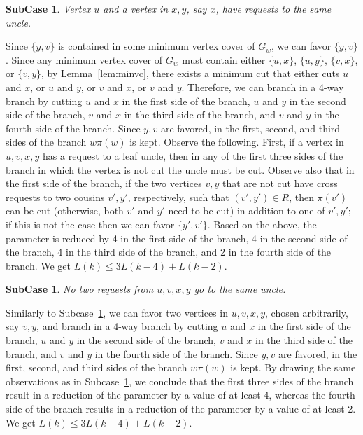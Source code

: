 \documentclass[11pt]{article}
\newtheorem{subcase}[theorem]{SubCase}
\begin{document}
\begin{subcase}
\label{subcase:73}
Vertex $u$ and a vertex in $x, y$, say $x$, have requests to the same uncle.
\end{subcase}


Since $\{y, v\}$ is contained in some minimum vertex cover of $G_w$, we can favor $\{y, v\}$. Since any minimum vertex cover of $G_w$ must contain either $\{u, x\}$, $\{u, y\}$,
$\{v, x\}$, or $\{v, y\}$, by Lemma~\ref{lem:minvc}, there exists a minimum cut that either cuts $u$ and $x$, or $u$ and $y$, or $v$ and $x$, or $v$ and $y$. Therefore, we can branch in a 4-way branch by cutting $u$ and $x$ in the first side of the branch, $u$ and $y$ in the second side of the branch, $v$ and $x$ in the third side of the branch, and $v$ and $y$ in the fourth side of the branch. Since $y, v$ are favored, in the first, second, and third sides of the branch $w\pi(w)$ is kept. Observe the following. First, if a vertex in $u, v, x, y$ has a request to a leaf uncle, then in any of the first three sides of the branch in which the vertex is not cut the uncle must be cut. Observe also that in the first side of the branch, if the two vertices $v, y$ that are not cut have cross requests to two cousins $v', y'$, respectively, such that $(v', y') \in R$, then $\pi(v')$ can be cut (otherwise, both $v'$ and $y'$ need to be cut) in addition to one of $v', y'$; if this is not the case then we can favor $\{y', v'\}$. Based on the above, the parameter is reduced by 4 in the first side of the branch, 4 in the second side of the branch, 4 in the third side of the branch, and 2 in the fourth side of the branch. We get
$L(k) \leq 3L(k-4) + L(k-2)$.


\begin{subcase}
\label{subcase:74}
No two requests from $u, v, x, y$ go to the same uncle.
\end{subcase}

Similarly to Subcase~\ref{subcase:73}, we can favor two vertices in $u, v, x, y$, chosen arbitrarily, say $v, y$, and branch in a 4-way branch by cutting $u$ and $x$ in the first side of the branch, $u$ and $y$ in the second side of the branch, $v$ and $x$ in the third side of the branch, and $v$ and $y$ in the fourth side of the branch. Since $y, v$ are favored, in the first, second, and third sides of the branch $w\pi(w)$ is kept. By drawing the same observations as in Subcase~\ref{subcase:73}, we conclude that the first three sides of the branch result in a reduction of the parameter by a value of at least 4, whereas the fourth side of the branch results in a reduction of the parameter by a value of at least 2. We get $L(k) \leq 3L(k-4) + L(k-2)$.
\end{document}
